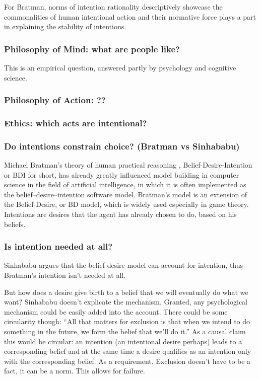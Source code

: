 For Bratman, norms of intention rationality descriptively showcase the commonalities of human intentional action and their normative force plays a part in explaining the stability of intentions. \citep*[p.~16]{bratman_shared_2014}

\subsubsection{Philosophy of Mind: what are people like?}
This is an empirical question, answered partly by psychology and cognitive science.
\subsubsection{Philosophy of Action: ??}
\subsubsection{Ethics: which acts are intentional?}
\subsubsection{Do intentions constrain choice? (Bratman vs Sinhababu)}
Michael Bratman’s theory of human practical reasoning \citep{bratman_intention_1987, bratman_shared_2014}, Belief-Desire-Intention or BDI for short, has already greatly influenced model building in computer science in the field of artificial intelligence, in which it is often implemented as the belief–desire–intention software model. Bratman's model is an extension of the Belief-Desire, or BD model, which is widely used especially in game theory. Intentions are desires that the agent has already chosen to do, based on his beliefs.

\subsubsection{Is intention needed at all?}
Sinhababu argues that the belief-desire model can account for intention, thus Bratman's intention isn't needed at all.

But how does a desire give birth to a belief that we will eventually do what we want? Sinhababu doesn’t explicate the mechanism. Granted, any psychological mechanism could be easily added into the account. There could be some circularity though: “All that matters for exclusion is that when we intend to do something in the future, we form the belief that we’ll do it.”
As a causal claim this would be circular: an intention (an intentional desire perhaps) leads to a corresponding belief and at the same time a desire qualifies as an intention only with the corresponding belief. As a requirement.
Exclusion doesn’t have to be a fact, it can be a norm. This allows for failure.

